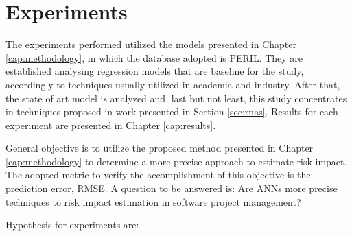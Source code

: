 \chapter{Experiments}\label{cap:experiments}

The experiments performed utilized the models presented in Chapter \ref{cap:methodology}, in which the database adopted is PERIL. They are established analysing regression models that are baseline for the study, accordingly to techniques usually utilized in academia and industry. After that, the state of art model is analyzed and, last but not least, this study concentrates in techniques proposed in work presented in Section \ref{sec:rnas}. Results for each experiment are presented in Chapter \ref{cap:results}.

General objective is to utilize the proposed method presented in Chapter \ref{cap:methodology} to determine a more precise approach to estimate risk impact. The adopted metric to verify the accomplishment of this objective is the prediction error, RMSE. A question to be answered is: Are ANNs more precise techniques to risk impact estimation in software project management?

Hypothesis for experiments are:

